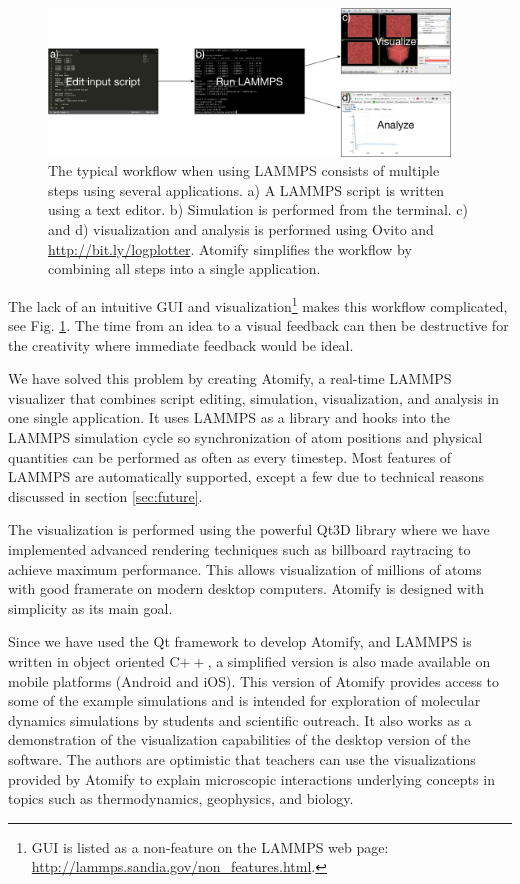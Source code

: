 \documentclass[aps,pre,twocolumn,letterpaper,floatfix,nofootinbib]{revtex4}
\newcommand*{\cpp}{C\ensuremath{++}\xspace}
\begin{document}
\begin{figure}
	\centering
	\includegraphics[width=0.95\textwidth]{flowchart.png}
	\caption{The typical workflow when using LAMMPS consists of multiple steps using several applications.
	a) A LAMMPS script is written using a text editor.
	b) Simulation is performed from the terminal.
	c) and d) visualization and analysis is performed using Ovito and \url{http://bit.ly/logplotter}.
	Atomify simplifies the workflow by combining all steps into a single application.}
	\label{fig:flowchart}
\end{figure}

The lack of an intuitive GUI and visualization\footnote{GUI is listed as a non-feature on the LAMMPS web page: \url{http://lammps.sandia.gov/non_features.html}.}
makes this workflow complicated, see Fig. \ref{fig:flowchart}.
The time from an idea to a visual feedback can then be destructive for the creativity where immediate feedback would be ideal.

We have solved this problem by creating Atomify, a real-time LAMMPS visualizer that combines script editing, simulation, visualization, and analysis in one single application.
It uses LAMMPS as a library and hooks into the LAMMPS simulation cycle so synchronization of atom positions and physical quantities can be performed as often as every timestep.
Most features of LAMMPS are automatically supported, except a few due to technical reasons discussed in section \ref{sec:future}.

The visualization is performed using the powerful Qt3D library where we have implemented advanced rendering techniques such as billboard raytracing to achieve maximum performance.
This allows visualization of millions of atoms with good framerate on modern desktop computers.
Atomify is designed with simplicity as its main goal.

Since we have used the Qt framework to develop Atomify, and LAMMPS is written in object oriented \cpp, a simplified version is also made available on mobile platforms (Android and iOS).
This version of Atomify provides access to some of the example simulations and is intended for exploration of molecular dynamics simulations by students and scientific outreach.
It also works as a demonstration of the visualization capabilities of the desktop version of the software.
The authors are optimistic that teachers can use the visualizations provided by
Atomify to explain microscopic interactions underlying concepts in topics such
as thermodynamics, geophysics, and biology.
\end{document}
